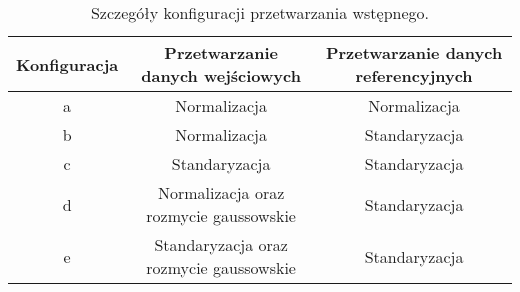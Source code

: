   \noindent\begin{table}[H]
    \center
    \begin{tabular}{|c | c | c| }
     \hline
     Konfiguracja & Przetwarzanie danych wejściowych & Przetwarzanie danych
     referencyjnych \\ [0.5ex]
    \hline
    a & Normalizacja & Normalizacja \\ \hline
    b & Normalizacja & Standaryzacja \\ \hline
    c & Standaryzacja & Standaryzacja \\ \hline
    d & Normalizacja oraz rozmycie gaussowskie & Standaryzacja \\ \hline
    e & Standaryzacja oraz rozmycie gaussowskie & Standaryzacja \\ \hline
    \end{tabular}
    \caption{Szczegóły konfiguracji przetwarzania wstępnego.}
    \label{table:preprocessing}
  \end{table}

